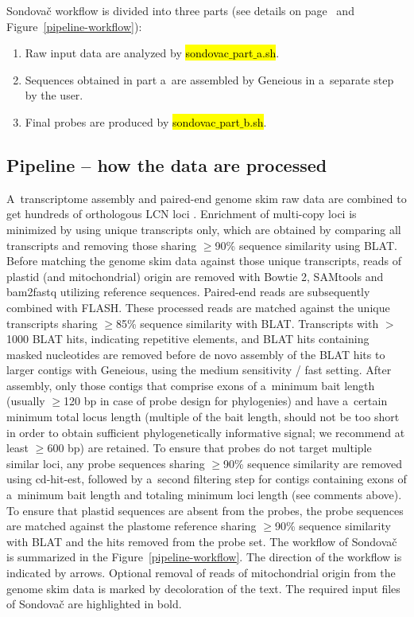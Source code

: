 \documentclass[a4paper, 11pt, twoside]{article}
\renewcommand{\texttt}[1]{\hl{\ttfamily #1}}
\begin{document}
Sondovač workflow is divided into three parts (see details on page~\pageref{pipeline-overview} and Figure~\ref{pipeline-workflow}):

\begin{enumerate}
\item Raw input data are analyzed by \texttt{sondovac$\_$part$\_$a.sh}.
\item Sequences obtained in part a~are assembled by Geneious in a~separate step by the user.
\item Final probes are produced by \texttt{sondovac$\_$part$\_$b.sh}.
\end{enumerate}

\subsection{Pipeline -- how the data are processed}

A~transcriptome assembly and paired-end genome skim raw data are combined to get hundreds of orthologous LCN loci \citep{Schmickl2016}. Enrichment of multi-copy loci is minimized by using unique transcripts only, which are obtained by comparing all transcripts and removing those sharing $\geq$90\% sequence similarity using BLAT. Before matching the genome skim data against those unique transcripts, reads of plastid (and mitochondrial) origin are removed with Bowtie 2, SAMtools and bam2fastq utilizing reference sequences. Paired-end reads are subsequently combined with FLASH. These processed reads are matched against the unique transcripts sharing $\geq$85\% sequence similarity with BLAT. Transcripts with $>$1000 BLAT hits, indicating repetitive elements, and BLAT hits containing masked nucleotides are removed before de novo assembly of the BLAT hits to larger contigs with Geneious, using the medium sensitivity / fast setting. After assembly, only those contigs that comprise exons of a~minimum bait length (usually $\geq$120 bp in case of probe design for phylogenies) and have a~certain minimum total locus length (multiple of the bait length, should not be too short in order to obtain sufficient phylogenetically informative signal; we recommend at least $\geq$600 bp) are retained. To ensure that probes do not target multiple similar loci, any probe sequences sharing $\geq$90\% sequence similarity are removed using cd-hit-est, followed by a~second filtering step for contigs containing exons of a~minimum bait length and totaling minimum loci length (see comments above). To ensure that plastid sequences are absent from the probes, the probe sequences are matched against the plastome reference sharing $\geq$90\% sequence similarity with BLAT and the hits removed from the probe set. The workflow of Sondovač is summarized in the Figure~\ref{pipeline-workflow}. The direction of the workflow is indicated by arrows. Optional removal of reads of mitochondrial origin from the genome skim data is marked by decoloration of the text. The required input files of Sondovač are highlighted in bold.
\end{document}
